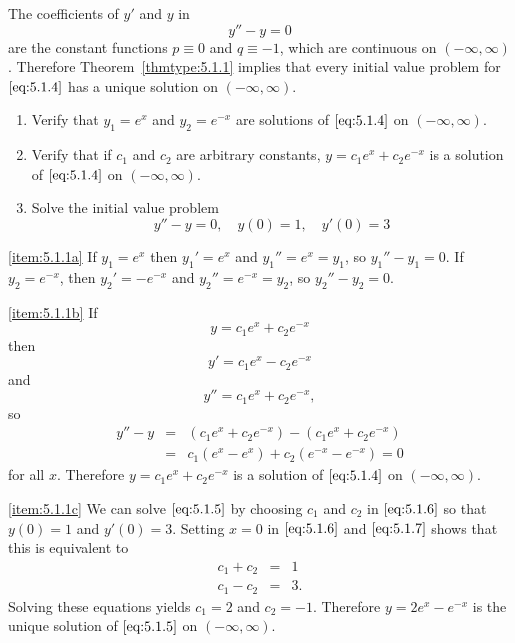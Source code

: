 \documentclass{ximera}
\begin{document}
\begin{example}\label{example:5.1.1} 
The coefficients of $y'$ and $y$ in
\begin{equation}\label{eq:5.1.4}
y''-y=0
\end{equation}
are the constant functions $p\equiv0$ and $q\equiv-1$, which are
continuous on $(-\infty,\infty)$. Therefore Theorem~\ref{thmtype:5.1.1}
implies that every initial value problem for $\eqref{eq:5.1.4}$  has a
unique solution on $(-\infty,\infty)$.
 
\begin{enumerate}
\item \label{item:5.1.1a} %
Verify that $y_1=e^x$ and $y_2=e^{-x}$ are solutions of
$\eqref{eq:5.1.4}$ on $(-\infty,\infty)$.
\item \label{item:5.1.1b}%
Verify that if $c_1$ and $c_2$ are arbitrary constants,
$y=c_1e^x+c_2e^{-x}$ is a solution of $\eqref{eq:5.1.4}$ on
$(-\infty,\infty)$.
\item \label{item:5.1.1c}%
Solve the initial value problem
\begin{equation}\label{eq:5.1.5}
y''-y=0,\quad y(0)=1,\quad y'(0)=3
\end{equation}
\end{enumerate}
\begin{explanation}
 
\ref{item:5.1.1a} If $y_1=e^x$ then $y_1'=e^x$ and $y_1''=e^x=y_1$,
so  $y_1''-y_1=0$.
If $y_2=e^{-x}$, then $y_2'=-e^{-x}$ and $y_2''=e^{-x}=y_2$,
so  $y_2''-y_2=0$.
 
\ref{item:5.1.1b} If
\begin{equation}\label{eq:5.1.6}
y=c_1e^x+c_2e^{-x}
\end{equation}
 then
\begin{equation}\label{eq:5.1.7}
y'=c_1e^x-c_2e^{-x}
\end{equation}
and
$$
y''=c_1e^x+c_2e^{-x},
$$
 so
\begin{eqnarray*}
y''-y&=&(c_1e^x+c_2e^{-x})-(c_1e^x+c_2e^{-x})\\
&=&c_1(e^x-e^x)+c_2(e^{-x}-e^{-x})=0
\end{eqnarray*}
for all $x$. Therefore $y=c_1e^x+c_2e^{-x}$ is a solution of
$\eqref{eq:5.1.4}$ on $(-\infty,\infty)$.
 
\ref{item:5.1.1c}
We can solve $\eqref{eq:5.1.5}$ by choosing $c_1$ and $c_2$ in $\eqref{eq:5.1.6}$
so that $y(0)=1$ and $y'(0)=3$. Setting $x=0$ in $\eqref{eq:5.1.6}$ and
$\eqref{eq:5.1.7}$ shows that this is equivalent to
\begin{eqnarray*}
c_1+c_2&=&1\\
c_1-c_2&=&3.
\end{eqnarray*}
Solving these equations yields  $c_1=2$  and $c_2=-1$.
Therefore $y=2e^x-e^{-x}$ is the unique solution of
$\eqref{eq:5.1.5}$ on $(-\infty,\infty)$.


\end{explanation}
\end{example}
\end{document}
